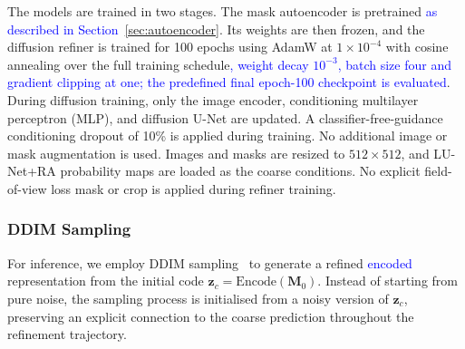 \documentclass[jimaging,article,submit,pdftex,moreauthors]
  {Definitions/mdpi}
\DeclareRobustCommand{\rev}[1]{\textcolor{blue}{#1}}
\DeclareRobustCommand{\rev}[1]{#1}
\providecommand{\linelabel}[1]{}
\newcommand{\seclabel}[1]{\linelabel{rev:sec:#1}}
\newcommand{\secend}[1]{\linelabel{rev:end:#1}}
\begin{document}
The models are trained in two stages. The mask autoencoder is pretrained \rev{as described in Section~\ref{sec:autoencoder}}. Its weights are then frozen, and the diffusion refiner is trained for 100 epochs using AdamW at $1\times10^{-4}$ with cosine annealing over the full training schedule\rev{, weight decay $10^{-3}$, batch size four and gradient clipping at one; the predefined final epoch-100 checkpoint is evaluated}. During diffusion training, only the image encoder, conditioning multilayer perceptron (MLP), and diffusion U-Net are updated. A classifier-free-guidance conditioning dropout of 10\% is applied during training. No additional image or mask augmentation is used. Images and masks are resized to $512\times512$, and LU-Net+RA probability maps are loaded as the coarse conditions. No explicit field-of-view loss mask or crop is applied during refiner training.\secend{objective}

\subsubsection{DDIM Sampling}
\label{sec:ddim_sampling}
\seclabel{ddim_sampling}

For inference, we employ DDIM sampling~\cite{Song2021} to generate a refined \rev{encoded} representation from the initial code $\mathbf{z}_c=\mathrm{Encode}(\mathbf{M}_0)$. Instead of starting from pure noise, the sampling process is initialised from a noisy version of $\mathbf{z}_c$, preserving an explicit connection to the coarse prediction throughout the refinement trajectory.
\end{document}
